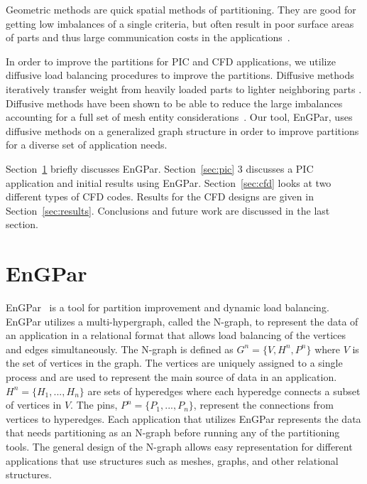 \documentclass[conference]{IEEEtran}
\begin{document}
Geometric methods are quick spatial methods of partitioning. They are good for getting low
imbalances of a single criteria, but often result in poor surface areas of parts and thus large
communication costs in the
applications~\cite{devineMultiJagged2015,bergerRib1987}.

In order to improve the partitions for PIC and CFD applications, we utilize diffusive
load balancing procedures to improve the partitions. Diffusive methods iteratively transfer
weight from heavily loaded parts to lighter neighboring parts
\cite{cybenko1989dynamic,subramanian1994analysis}. Diffusive methods have been shown to be
able to reduce the large imbalances accounting for a full set of mesh entity
considerations~\cite{SmithParma2015}. Our tool, EnGPar, uses diffusive methods on a
generalized graph structure in order to improve partitions for a diverse set of application needs.

Section~\ref{sec:engpar}  briefly discusses EnGPar.
Section~\ref{sec:pic} 3 discusses a PIC application and initial results
using EnGPar. Section~\ref{sec:cfd} looks at two different types of CFD codes. Results for the CFD
designs are given in Section~\ref{sec:results}. Conclusions and future work are
discussed in the last section.

\section{EnGPar} \label{sec:engpar}


EnGPar~\cite{engparSC17,engpar_github} is a tool for partition improvement and
dynamic load balancing.
EnGPar utilizes a multi-hypergraph, called the N-graph, to represent the data of
an application in a relational format that allows load balancing of the vertices
and edges simultaneously.
The N-graph is defined as $G^n = \{V, H^n, P^n\}$ where
$V$ is the set of vertices in the graph. The vertices are uniquely assigned to a single
process and are used to represent the main source of data in an application.
$H^n = \{H_1, ..., H_n\}$ are sets of hyperedges where each hyperedge connects a
subset of vertices in $V$. The pins, $P^n = \{P_1,...,P_n\}$, represent the connections from
vertices to hyperedges. Each application that utilizes EnGPar represents the data
that needs partitioning as an N-graph before running any of the partitioning tools.
The general design of the N-graph allows easy representation for different applications
that use structures such as meshes, graphs, and other relational structures.
\end{document}
